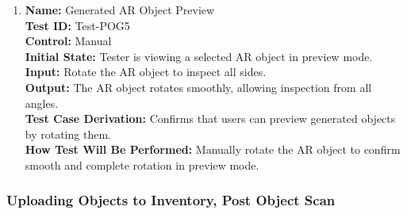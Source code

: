 \documentclass[12pt, titlepage]{article}
\begin{document}
\begin{enumerate}
  \item \textbf{Name:} Generated AR Object Preview \label{itm:Test-POG5} \\
        \textbf{Test ID:} Test-POG5 \\
        \textbf{Control:} Manual \\
        \textbf{Initial State:} Tester is viewing a selected AR object in preview mode. \\
        \textbf{Input:} Rotate the AR object to inspect all sides. \\
        \textbf{Output:} The AR object rotates smoothly, allowing inspection from all angles. \\
        \textbf{Test Case Derivation:} Confirms that users can preview generated objects by rotating them. \\
        \textbf{How Test Will Be Performed:} Manually rotate the AR object to confirm smooth and complete rotation in preview mode. \\

\end{enumerate}

\subsubsection{Uploading Objects to Inventory, Post Object Scan}
\end{document}
